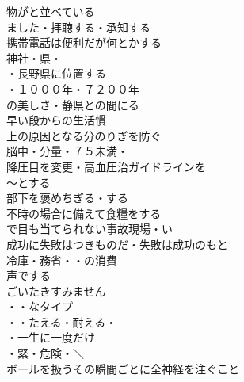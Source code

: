 \begin{multicols}{2}
物がと並べている\\
ました・拝聴する・承知する\\
携帯電話は便利だが何とかする\\

神社・県・\\
・長野県に位置する\\
・１０００年・７２００年\\
の美しさ・静県との間にる\\

早い段からの生活慣\\
上の原因となる分のりぎを防ぐ\\
脳中・分量・７５未満・\\
降圧目を変更・高血圧治ガイドラインを\\

〜とする\\
部下を褒めちぎる・する\\
不時の場合に備えて食糧をする\\
で目も当てられない事故現場・い\\
成功に失敗はつきものだ・失敗は成功のもと\\
冷庫・務省・・の消費\\

声でする\\
ごいたきすみません\\
・・なタイプ\\
・・たえる・耐える・\\

・一生に一度だけ\\
・緊・危険・＼\\
ボールを扱うその瞬間ごとに全神経を注ぐこと\\

\end{multicols}

